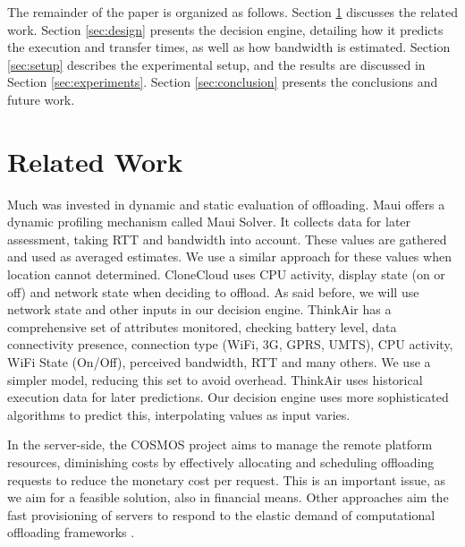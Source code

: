 \documentclass[10pt, conference, letterpaper]{IEEEtran}
\begin{document}

The remainder of the paper is organized as follows. Section \ref{sec:related} discusses the related work. Section \ref{sec:design} presents the decision engine, detailing how it predicts the execution and transfer times, as well as how bandwidth is estimated. Section \ref{sec:setup} describes the experimental setup, and the results are discussed in Section \ref{sec:experiments}. Section \ref{sec:conclusion} presents the conclusions and future work.

\section{Related Work}
\label{sec:related}

  Much was invested in dynamic and static evaluation of offloading. Maui \cite{Cuervo:2010:MMS:1814433.1814441} offers a dynamic profiling mechanism called Maui Solver. It collects data for later assessment, taking RTT and bandwidth into account. These values are gathered and used as averaged estimates. We use a similar approach for these values when location cannot determined. CloneCloud \cite{Chun:2011:CEE:1966445.1966473} uses CPU activity, display state (on or off) and network state when deciding to offload. As said before, we will use network state and other inputs in our decision engine. ThinkAir \cite{kosta2012thinkair} has a comprehensive set of attributes monitored, checking battery level, data connectivity presence, connection type (WiFi, 3G, GPRS, UMTS), CPU activity, WiFi State (On/Off), perceived bandwidth, RTT and many others. We use a simpler model, reducing this set to avoid overhead. ThinkAir uses historical execution data for later predictions. Our decision engine uses more sophisticated algorithms to predict this, interpolating values as input varies.

  In the server-side, the COSMOS \cite{Shi:2014:CCO:2632951.2632958} project aims to manage the remote platform resources, diminishing costs by effectively allocating and scheduling offloading requests to reduce the monetary cost per request. This is an important issue, as we aim for a feasible solution, also in financial means. Other approaches aim the fast provisioning of servers to respond to the elastic demand of computational offloading frameworks \cite{Ha:2013:JPC:2462456.2464451}.
\end{document}

